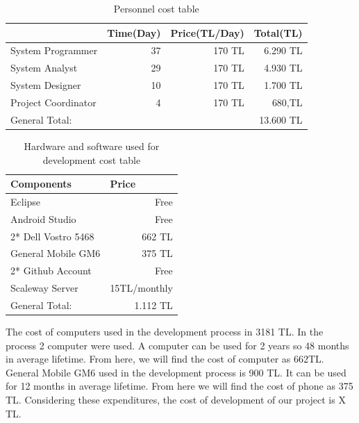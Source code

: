 \begin{table}[!h!]
\centering
\caption{Personnel cost table}
\label{tab:maas}
\begin{tabular}{|l|r|r|r|}
\hline
& \multicolumn{1}{l|}{\textbf{Time(Day)}} & \multicolumn{1}{l|}{\textbf{Price(TL/Day)}} & \multicolumn{1}{l|}{\textbf{Total(TL)}} \\ \hline
System Programmer   & 37                                      & 170 TL                                      & 6.290 TL                                 \\ \hline
System Analyst      & 29                                      & 170 TL                                      & 4.930 TL                                 \\ \hline
System Designer     & 10                                      & 170 TL                                      & 1.700 TL                                 \\ \hline
Project Coordinator & 4                                       & 170 TL                                      & 680,TL                                  \\ \hline
General Total:      & \multicolumn{3}{r|}{13.600 TL}                                                                                                  \\ \hline
\end{tabular}
\end{table}

\begin{table}[!h!]
\centering
\caption{Hardware and software used for development cost table}
\label{tab:hardsoftcost}
\begin{tabular}{|l|r|}
\hline
\textbf{Components}             & \multicolumn{1}{l|}{\textbf{Price}} \\ \hline
Eclipse \cite{eclipse} & Free \\ \hline
Android Studio \cite{androidStudio} & Free \\ \hline
2* Dell Vostro 5468 & 662 TL \\ \hline
General Mobile GM6 \cite{gm6} & 375 TL                            \\ \hline
2* Github Account                  & Free                             \\ \hline
Scaleway Server                  & 15TL/monthly                             \\ \hline
General Total:                  & 1.112 TL                            \\ \hline
\end{tabular}
\end{table}
The cost of computers used in the development process in 3181 TL\cite{dell}. In the process 2 computer were used. A computer can be used for 2 years so 48 months in average lifetime. From here, we will find the cost of computer as 662TL. General Mobile GM6 used in the development process is 900 TL\cite{gm6}. It can be used for 12 months in average lifetime. From here we will find the cost of phone as 375 TL. Considering these expenditures, the cost of development of our project is X TL.
